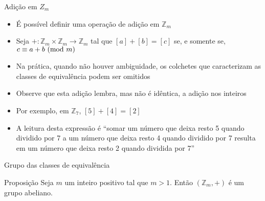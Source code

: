 \begin{frame}[fragile]{Adição em $Z_m$}

    \begin{itemize}
        \item É possível definir uma operação de adição em $\mathbb{Z}_m$

        \item Seja $+: \mathbb{Z}_m\times \mathbb{Z}_m \to \mathbb{Z}_m$ tal que
        $[a] + [b] = [c]$ se, e somente se, $c\equiv a + b\ (\mbox{mod}\ m)$

        \item Na prática, quando não houver ambiguidade, os colchetes que caracterizam as classes
            de equivalência podem ser omitidos

        \item Observe que esta adição lembra, mas não é idêntica, a adição nos inteiros

        \item Por exemplo, em $\mathbb{Z}_7$, $[5] + [4] = [2]$ 

        \item A leitura desta expressão é ``somar um número que deixa resto 5 quando dividido por
            7 a um número que deixa resto 4 quando dividido por 7 resulta em um número que deixa
            resto 2 quando dividida por 7''
    \end{itemize}

\end{frame}

\begin{frame}[fragile]{Grupo das classes de equivalência}

    \begin{block}{Proposição}
        Seja $m$ um inteiro positivo tal que $m > 1$. Então $(\mathbb{Z}_m, +)$ é um grupo
            abeliano.
    \end{block}

\end{frame}

